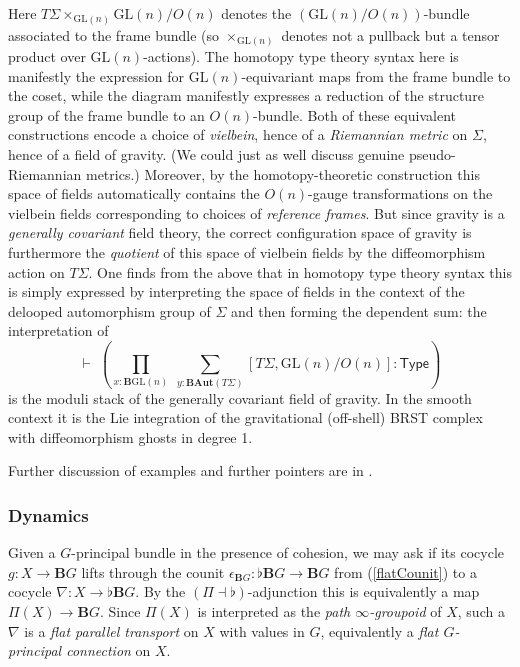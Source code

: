 \documentclass[copyright,12pt]{eptcs}
\newcommand{\type}{\ensuremath{\mathsf{Type}}\xspace}
\begin{document}
Here $T \Sigma \times_{\mathrm{GL}(n)} \mathrm{GL}(n)/O(n)$ denotes the $(\mathrm{GL}(n)/O(n))$-bundle associated to the frame bundle (so $\times_{\mathrm{GL}(n)}$ denotes not a pullback but a tensor product over $\mathrm{GL}(n)$-actions).
The homotopy type theory syntax here is manifestly the expression for $\mathrm{GL}(n)$-equivariant maps from the
frame bundle to the coset, while the diagram manifestly expresses a reduction of the
structure group of the frame bundle to an $O(n)$-bundle. Both of these equivalent
constructions encode a choice of \emph{vielbein}, hence of a \emph{Riemannian metric}
on $\Sigma$, hence of a field of gravity. (We could just as well discuss
genuine pseudo-Riemannian metrics.) Moreover, by the homotopy-theoretic construction
this space of fields automatically contains the $O(n)$-gauge transformations on the vielbein
fields corresponding to choices of \emph{reference frames}.
But since gravity is a \emph{generally covariant} field theory,  the correct
configuration space of gravity is furthermore the \emph{quotient} of this space of
vielbein fields by the diffeomorphism action on $T \Sigma$. One finds from the above that
in homotopy type theory syntax this is simply expressed by interpreting the
space of fields in the context of the delooped automorphism group of $\Sigma$
and then forming the dependent sum:
the interpretation of
$$
  \vdash\;\left( \prod_{x : \mathbf{B}\mathrm{GL}(n)} \;\sum_{y : \mathbf{B}\mathbf{Aut}(T \Sigma)}
    [T \Sigma, \mathrm{GL}(n)/O(n)] : \type\right)
$$
is the moduli stack of the generally covariant field of gravity. In the
smooth context it is the Lie integration of the gravitational (off-shell) BRST complex with diffeomorphism
ghosts in degree 1.

Further discussion of examples and further
pointers are in \cite{SchreiberLectures, SchreiberErlangen}.




\subsubsection{Dynamics}
\label{Dynamics}

Given a $G$-principal bundle in the presence of cohesion, we may ask if its cocycle $g : X \to \mathbf{B}G$
lifts through the counit $\epsilon_{\mathbf{B}G} : \flat \mathbf{B}G \to \mathbf{B}G$
from (\ref{flatCounit}) to a cocycle
$\nabla : X \to \flat \mathbf{B}G$. By the $(\Pi \dashv \flat)$-adjunction this is equivalently
a map $\Pi(X) \to \mathbf{B}G$. Since $\Pi(X)$ is interpreted as the \emph{path $\infty$-groupoid}
of $X$, such a $\nabla$ is a \emph{flat parallel transport} on $X$ with values in $G$, equivalently
a \emph{flat $G$-principal connection} on $X$.
\end{document}
